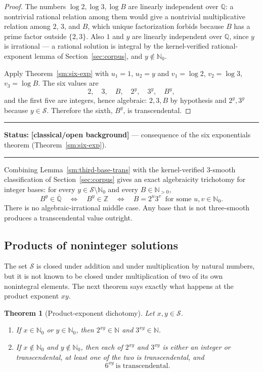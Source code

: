 \documentclass[11pt,oneside]{article}
\newtheorem{theorem}{Theorem}[section]
\theoremstyle{definition}
\theoremstyle{remark}
\newcommand{\N}{\mathbb N}
\newcommand{\Nzero}{\mathbb N_0}
\newcommand{\Z}{\mathbb Z}
\newcommand{\Q}{\mathbb Q}
\newcommand{\Abar}{\overline{\mathbb Q}}
\newcommand{\Sol}{\mathcal S}
\newcommand{\statusknown}{\textcolor{classicalgray}{\textbf{[classical/open background]}}}
\newenvironment{statusbox}[1]
{\begin{center}\begin{minipage}{0.94\textwidth}\raggedright\hbadness=10000\hrule
\vspace{0.45em}\textbf{Status:} #1\par\vspace{0.35em}}
{\vspace{0.35em}\hrule\end{minipage}\end{center}}
\begin{document}
\begin{proof}
The numbers $\log2,\log3,\log B$ are linearly independent over $\Q$: a nontrivial rational
relation among them would give a nontrivial multiplicative relation among $2$, $3$, and $B$,
which unique factorization forbids because $B$ has a prime factor outside $\{2,3\}$.  Also
$1$ and $y$ are linearly independent over $\Q$, since $y$ is irrational --- a rational
solution is integral by the kernel-verified rational-exponent lemma of
Section~\ref{sec:corpus}, and $y\notin\Nzero$.

Apply Theorem~\ref{sm:six-exp} with $u_1=1$, $u_2=y$ and $v_1=\log2$, $v_2=\log3$,
$v_3=\log B$.  The six values are
\[
 2,\quad 3,\quad B,\quad 2^y,\quad 3^y,\quad B^y,
\]
and the first five are integers, hence algebraic: $2,3,B$ by hypothesis and $2^y,3^y$
because $y\in\Sol$.  Therefore the sixth, $B^y$, is transcendental.
\end{proof}

\begin{statusbox}{\statusknown{} --- consequence of the six exponentials theorem
(Theorem~\ref{sm:six-exp}).}
\end{statusbox}

Combining Lemma~\ref{sm:third-base-trans} with the kernel-verified $3$-smooth classification
of Section~\ref{sec:corpus} gives an exact algebraicity trichotomy for integer bases: for
every $y\in\Sol\setminus\Nzero$ and every $B\in\N_{>0}$,
\begin{equation}
 B^y\in\Abar
 \quad\Longleftrightarrow\quad
 B^y\in\Z
 \quad\Longleftrightarrow\quad
 B=2^u3^v\ \text{ for some }u,v\in\Nzero .
 \label{sm:eq-trichotomy}
\end{equation}
There is no algebraic-irrational middle case.  Any base that is not three-smooth produces a
transcendental value outright.

\subsection{Products of noninteger solutions}

The set $\Sol$ is closed under addition and under multiplication by natural numbers, but it
is not known to be closed under multiplication of two of its own nonintegral elements.  The
next theorem says exactly what happens at the product exponent $xy$.

\begin{theorem}[Product-exponent dichotomy]
\label{sm:product-trans}
Let $x,y\in\Sol$.
\begin{enumerate}[label=\textup{(\alph*)}]
\item If $x\in\Nzero$ or $y\in\Nzero$, then $2^{xy}\in\N$ and $3^{xy}\in\N$.
\item If $x\notin\Nzero$ and $y\notin\Nzero$, then each of $2^{xy}$ and $3^{xy}$ is either an
integer or transcendental, at least one of the two is transcendental, and
\[
 6^{xy}\ \text{is transcendental}.
\]
\end{enumerate}
\end{theorem}
\end{document}
